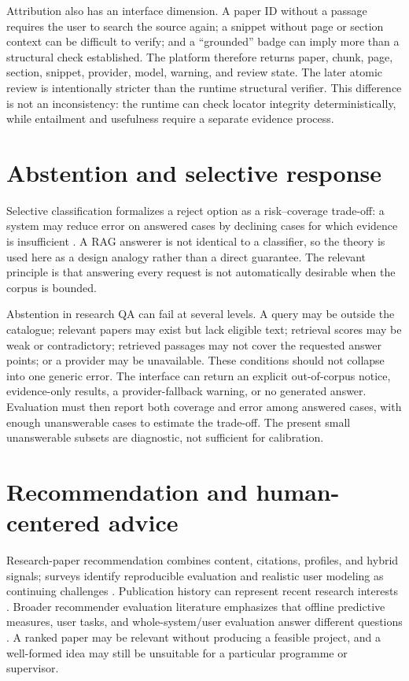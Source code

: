 Attribution also has an interface dimension. A paper ID without a passage requires the user to search the source again; a snippet without page or section context can be difficult to verify; and a ``grounded'' badge can imply more than a structural check established. The platform therefore returns paper, chunk, page, section, snippet, provider, model, warning, and review state. The later atomic review is intentionally stricter than the runtime structural verifier. This difference is not an inconsistency: the runtime can check locator integrity deterministically, while entailment and usefulness require a separate evidence process.

\section{Abstention and selective response}

Selective classification formalizes a reject option as a risk--coverage trade-off: a system may reduce error on answered cases by declining cases for which evidence is insufficient \cite{elyaniv2010selective}. A RAG answerer is not identical to a classifier, so the theory is used here as a design analogy rather than a direct guarantee. The relevant principle is that answering every request is not automatically desirable when the corpus is bounded.

Abstention in research QA can fail at several levels. A query may be outside the catalogue; relevant papers may exist but lack eligible text; retrieval scores may be weak or contradictory; retrieved passages may not cover the requested answer points; or a provider may be unavailable. These conditions should not collapse into one generic error. The interface can return an explicit out-of-corpus notice, evidence-only results, a provider-fallback warning, or no generated answer. Evaluation must then report both coverage and error among answered cases, with enough unanswerable cases to estimate the trade-off. The present small unanswerable subsets are diagnostic, not sufficient for calibration.

\section{Recommendation and human-centered advice}

Research-paper recommendation combines content, citations, profiles, and hybrid signals; surveys identify reproducible evaluation and realistic user modeling as continuing challenges \cite{beel2016researchpaper}. Publication history can represent recent research interests \cite{sugiyama2010scholarly}. Broader recommender evaluation literature emphasizes that offline predictive measures, user tasks, and whole-system/user evaluation answer different questions \cite{herlocker2004evaluating}. A ranked paper may be relevant without producing a feasible project, and a well-formed idea may still be unsuitable for a particular programme or supervisor.

